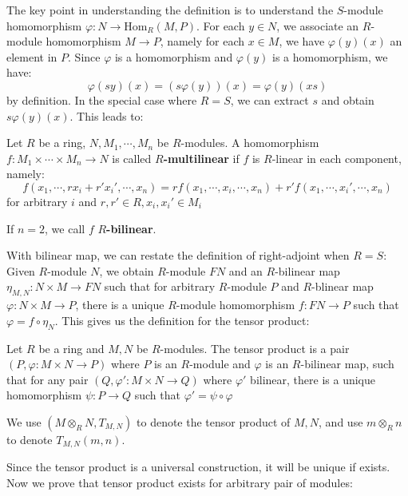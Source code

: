 \documentclass{note-eng}
\begin{document}
The key point in understanding the definition is to understand the $S$-module homomorphism $\varphi: N \rightarrow \mathrm{Hom}_{R}(M, P)$. For each $y \in N$, we associate an $R$-module homomorphism $M \rightarrow P$, namely for each $x \in M$, we have $\varphi(y)(x)$ an element in $P$. Since $\varphi$ is a homomorphism and $\varphi(y)$ is a homomorphism, we have:
$$\varphi(sy)(x) = (s \varphi(y))(x) = \varphi(y)(xs)$$
by definition. In the special case where $R = S$, we can extract $s$ and obtain $s\varphi(y)(x)$. This leads to:

\begin{definition}
    Let $R$ be a ring, $N, M_1, \cdots, M_n$ be $R$-modules. A homomorphism $f: M_1 \times \cdots \times M_n \rightarrow N$ is called \textbf{$R$-multilinear} if $f$ is $R$-linear in each component, namely:
    $$f(x_1, \cdots, rx_i + r'x_i', \cdots, x_n) = r f(x_1, \cdots, x_i, \cdots, x_n) + r' f(x_1, \cdots, x_i', \cdots, x_n)$$
    for arbitrary $i$ and $r, r' \in R, x_i, x_i' \in M_i$

    If $n = 2$, we call $f$ \textbf{$R$-bilinear}.
\end{definition}

With bilinear map, we can restate the definition of right-adjoint when $R = S$: Given $R$-module $N$, we obtain $R$-module $FN$ and an $R$-bilinear map $\eta_{M, N}: N \times M \rightarrow FN$ such that for arbitrary $R$-module $P$ and $R$-blinear map $\varphi: N \times M \rightarrow P$, there is a unique $R$-module homomorphism $f: FN \rightarrow P$ such that $\varphi = f \circ \eta_N$. This gives us the definition for the tensor product:

\begin{definition}
    Let $R$ be a ring and $M, N$ be $R$-modules. The tensor product is a pair $(P, \varphi: M \times N \rightarrow P)$ where $P$ is an $R$-module and $\varphi$ is an $R$-bilinear map, such that for any pair $(Q, \varphi': M \times N \rightarrow Q)$ where $\varphi'$ bilinear, there is a unique homomorphism $\psi: P \rightarrow Q$ such that $\varphi' = \psi \circ \varphi$

    We use $(M \otimes_R N, T_{M, N})$ to denote the tensor product of $M, N$, and use $m \otimes_R n$ to denote $T_{M, N}(m, n)$.
\end{definition}

Since the tensor product is a universal construction, it will be unique if exists. Now we prove that tensor product exists for arbitrary pair of modules:
\end{document}
